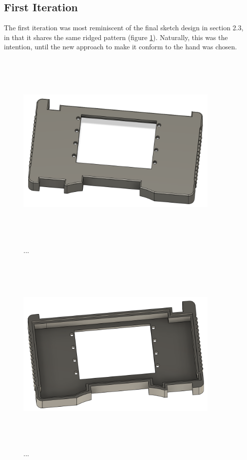 \subsection{First Iteration}

The first iteration was most reminiscent of the final sketch design in section 2.3, in that it shares the same ridged pattern (figure \ref{fig:iteration1_t_f}).
Naturally, this was the intention, until the new approach to make it conform to the hand was chosen.

\begin{figure} [h]
    \centering
    \includegraphics[width=10cm,height=10cm,keepaspectratio]{Figures/iteration1_top_front.png}
    \caption{...}
    \label{fig:iteration1_t_f}
\end{figure}

\begin{figure} [h]
    \centering
    \includegraphics[width=10cm,height=10cm,keepaspectratio]{Figures/iteration1_top_back.png}
    \caption{...}
    \label{fig:iteration1_t_b}
\end{figure}

